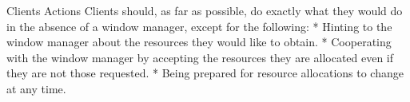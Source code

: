 %
%

\secc Clients Actions
Clients should, as far as possible, do exactly what they would do in the absence of a window manager,
except for the following:
\begitems
* Hinting to the window manager about the resources they would like to obtain.
* Cooperating with the window manager by accepting the resources they are allocated even if they are not those requested.
* Being prepared for resource allocations to change at any time.
\enditems

